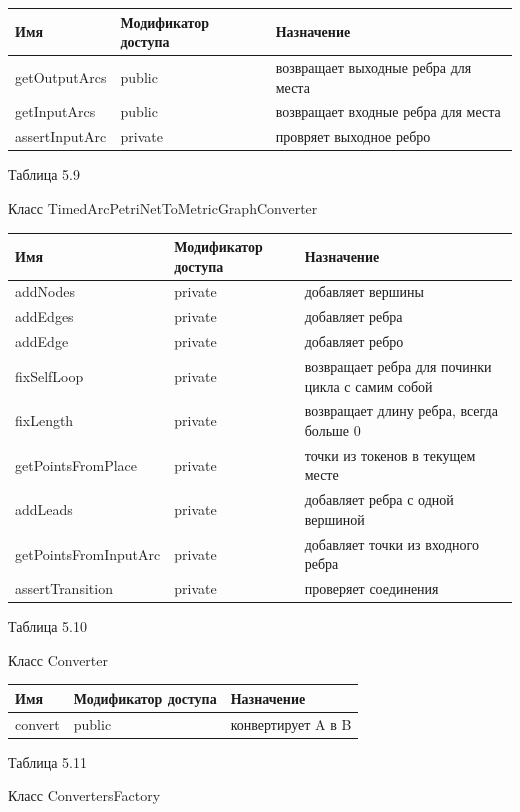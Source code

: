 \documentclass{../TechDoc}
\begin{document}
	\begin{tabular}{|p{5cm}|p{5cm}|p{5cm}|}
		\hline
		\textbf{Имя} & \textbf{Модификатор доступа} & \textbf{Назначение} \\
		\hline
		getOutputArcs & public & возвращает выходные ребра для места\\
		\hline
		getInputArcs& public & возвращает входные ребра для места\\
		\hline
		assertInputArc& private & провряет выходное ребро\\
		
		\hline
	\end{tabular}
	
	\begin{flushright}
		Таблица 5.9
	\end{flushright}
	Класс TimedArcPetriNetToMetricGraphConverter
	
	\begin{tabular}{|p{5cm}|p{5cm}|p{5cm}|}
		\hline
		\textbf{Имя} & \textbf{Модификатор доступа} & \textbf{Назначение} \\
		\hline
		addNodes& private & добавляет вершины\\
		\hline
		addEdges& private& добавляет ребра\\
		\hline
		addEdge& private& добавляет ребро\\
		\hline
		fixSelfLoop& private& возвращает ребра для починки цикла с самим собой\\
		\hline
		fixLength& private& возвращает длину ребра, всегда больше 0\\
		\hline
		getPointsFromPlace& private& точки из токенов в текущем месте\\
		\hline
		addLeads&private& добавляет ребра с одной вершиной\\
		\hline
		getPointsFromInputArc& private& добавляет точки из входного ребра \\
		\hline
		assertTransition&private & проверяет соединения\\
		
		\hline
	\end{tabular}

	\begin{flushright}
		Таблица 5.10
	\end{flushright}
	Класс Converter
	
	\begin{tabular}{|p{5cm}|p{5cm}|p{5cm}|}
		\hline
		\textbf{Имя} & \textbf{Модификатор доступа} & \textbf{Назначение} \\
		\hline
		convert& public & конвертирует A в B\\
		
		\hline
	\end{tabular}
	\begin{flushright}
		Таблица 5.11
	\end{flushright}
	Класс ConvertersFactory
	
\end{document}

